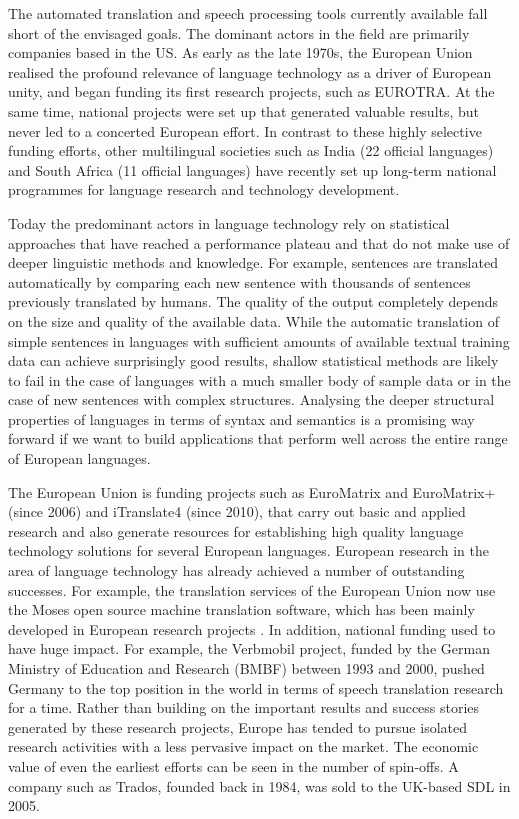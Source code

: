 \documentclass[10pt, plain]{../../metanetpaper}
\begin{document}
\begin{multicols}{2}
The automated translation and speech processing tools currently available fall short of the envisaged goals. The dominant actors in the field are primarily companies based in the US. As early as the late 1970s, the European Union realised the profound relevance of language technology as a driver of European unity, and began funding its first research projects, such as EUROTRA. At the same time, national projects were set up that generated valuable results, but never led to a concerted European effort. In contrast to these highly selective funding efforts, other multilingual societies such as India (22 official languages) and South Africa (11 official languages) have recently set up long-term national programmes for language research and technology development.

Today the predominant actors in language technology rely on statistical approaches that have reached a performance plateau and that do not make use of deeper linguistic methods and knowledge. For example, sentences are translated automatically by comparing each new sentence with thousands of sentences previously translated by humans. The quality of the output completely depends on the size and quality of the available data. While the automatic translation of simple sentences in languages with sufficient amounts of available textual training data can achieve surprisingly good results, shallow statistical methods are likely to fail in the case of languages with a much smaller body of sample data or in the case of new sentences with complex structures. Analysing the deeper structural properties of languages in terms of syntax and semantics is a promising way forward if we want to build applications that perform well across the entire range of European languages.

The European Union is funding projects such as EuroMatrix and EuroMatrix+ (since 2006) and iTranslate4 (since 2010), that carry out basic and applied research and also generate resources for establishing high quality language technology solutions for several European languages. European research in the area of language technology has already achieved a number of outstanding successes. For example, the translation services of the European Union now use the Moses open source machine translation software, which has been mainly developed in European research projects \cite{moses}. In addition, national funding used to have huge impact. For example, the Verbmobil project, funded by the German Ministry of Education and Research (BMBF) between 1993 and 2000, pushed Germany to the top position in the world in terms of speech translation research for a time. Rather than building on the important results and success stories generated by these research projects, Europe has tended to pursue isolated research activities with a less pervasive impact on the market. The economic value of even the earliest efforts can be seen in the number of spin-offs. A company such as Trados, founded back in 1984, was sold to the UK-based SDL in 2005.


\end{multicols}
\end{document}

